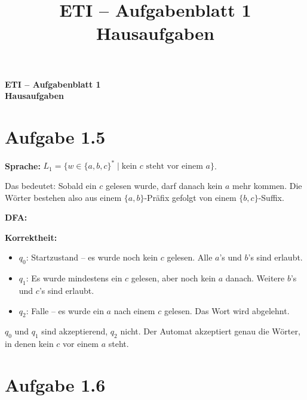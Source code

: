 \documentclass[a4paper,12pt]{article}
\title{ETI -- Aufgabenblatt 1 \\ Hausaufgaben}
\author{}
\date{}
\begin{document}
\raggedright
\setlength{\parindent}{0pt}

{\LARGE\bfseries ETI -- Aufgabenblatt 1 \\ Hausaufgaben\par}
\vspace{2em}

\section*{Aufgabe 1.5}

\textbf{Sprache:} $L_1 = \{w \in \{a,b,c\}^* \mid \text{kein } c \text{ steht vor einem } a\}$.

Das bedeutet: Sobald ein $c$ gelesen wurde, darf danach kein $a$ mehr kommen. Die Wörter bestehen also aus einem $\{a,b\}$-Präfix gefolgt von einem $\{b,c\}$-Suffix.

\textbf{DFA:}

\begin{flushleft}
\end{flushleft}

\textbf{Korrektheit:}
\begin{itemize}
    \item $q_0$: Startzustand -- es wurde noch kein $c$ gelesen. Alle $a$'s und $b$'s sind erlaubt.
    \item $q_1$: Es wurde mindestens ein $c$ gelesen, aber noch kein $a$ danach. Weitere $b$'s und $c$'s sind erlaubt.
    \item $q_2$: Falle -- es wurde ein $a$ nach einem $c$ gelesen. Das Wort wird abgelehnt.
\end{itemize}
$q_0$ und $q_1$ sind akzeptierend, $q_2$ nicht. Der Automat akzeptiert genau die Wörter, in denen kein $c$ vor einem $a$ steht.

\section*{Aufgabe 1.6}
\end{document}
